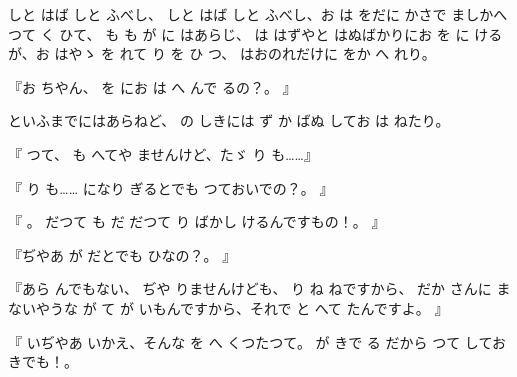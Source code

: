 
しと
はば
しと
ふべし、
しと
はば
しと
ふべし、お
は
をだに
かさで
ましかへつて
く
ひて、
も
も
が
に
はあらじ、
は
はずやと
はぬばかりにお
を
に
けるが、お
はやゝ
を
れて
り
を
ひ
つ、
はおのれだけに
をか
へ
れり。

『お
ちやん、
を
にお
は
へ
んで
るの？。
』

といふまでにはあらねど、
の
しきには
ず
か
ばぬ
してお
は
ねたり。

『
つて、
も
へてや
ませんけど、たゞ
り
も……』

『
り
も……
になり
ぎるとでも
つておいでの？。
』

『
。
だつて
も
だ
だつて
り
ばかし
けるんですもの！。
』

『ぢやあ
が
だとでも
ひなの？。
』

『あら
んでもない、
ぢや
りませんけども、
り
ね
ねですから、
だか
さんに
まないやうな
が
て
が
いもんですから、それで
と
へて
たんですよ。
』

『
いぢやあ
いかえ、そんな
を
へ
くつたつて。
が
きで
る
だから
つて
してお
きでも！。

